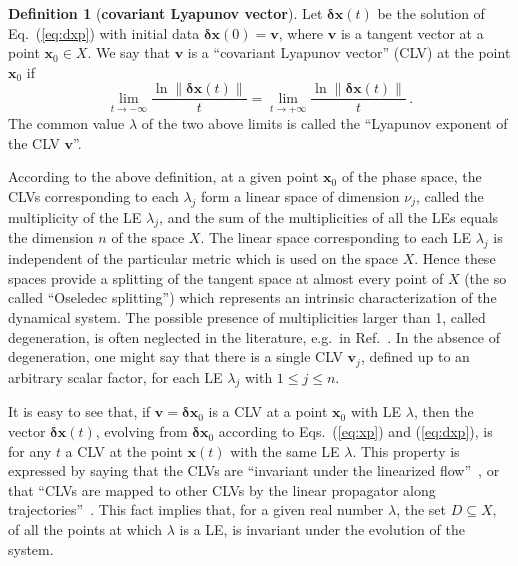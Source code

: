 \documentclass{article}
\theoremstyle{plain}
\theoremstyle{definition}
\newtheorem{definition}[theorem]{Definition}
\theoremstyle{remark}
\newcommand{\vect}[1]{\boldsymbol{#1}}
\providecommand{\detail}[1]{#1}
\renewcommand{\detail}[1]{}
\begin{document}
\begin{definition}[{\bf covariant Lyapunov vector}]\label{def:clv}
  Let $\vect{\delta x}(t)$ be the solution of Eq.~(\ref{eq:dxp}) with
  initial data $\vect{\delta x}(0)=\vect{v}$, where $\vect{v}$ is a
  tangent vector at a point $\vect{x}_0\in X$. We say that $\vect{v}$
  is a ``covariant Lyapunov vector'' (CLV) at the point $\vect{x}_0$ if
  \begin{equation}\label{eq:limits}
    \lim_{t\to -\infty} \frac{\ln \lVert \vect{\delta x}(t) \rVert}{t} =
    \lim_{t\to +\infty} \frac{\ln \lVert \vect{\delta x}(t) \rVert}{t} \, .
  \end{equation}
  The common value $\lambda$ of the two above limits is called the
  ``Lyapunov exponent of the CLV $\vect{v}$''.
\end{definition}

According to the above definition, at a given point $\vect{x}_0$ of 
the phase space,
the CLVs corresponding to each $\lambda_j$ form a linear space of
dimension $\nu_j$, called the multiplicity of the LE $\lambda_j$, and
the sum of the multiplicities of all the LEs equals the dimension $n$
of the space $X$.  The linear space corresponding to each LE
$\lambda_j$ is independent of the particular metric which is used on
the space $X$. Hence these spaces provide a splitting of the tangent
space at almost every point of $X$ (the so called ``Oseledec
splitting'') which represents an intrinsic characterization of the
dynamical system.  The possible presence of multiplicities larger than
1, called degeneration, is often neglected in the literature, e.g.\ in
Ref.~\cite{ginelli2007}. \detail{see note 10} In the absence of
degeneration, one might say that
there is a single CLV $\vect{v}_j$, defined up to an
arbitrary scalar factor, for each LE $\lambda_j$ with $1\le j\le n$.

It is easy to see that, if $\vect{v}=\vect{\delta x}_0$ is a CLV at a
point $\vect{x}_0$ with LE $\lambda$, then the vector $\vect{\delta
  x}(t)$, evolving from $\vect{\delta x}_0$ according to
Eqs.~(\ref{eq:xp}) and (\ref{eq:dxp}), is for any $t$ a CLV at the
point $\vect{x}(t)$ with the same LE $\lambda$.  This property is
expressed by saying that the CLVs are ``invariant under the linearized
flow''~\cite{wolfe2007}, or that ``CLVs are mapped to other CLVs by
the linear propagator along trajectories''~\cite{noethen_thesis}.
This fact implies that, for a given real number $\lambda$, the set
$D\subseteq X$, of all the points at which $\lambda$ is a LE, is
invariant under the evolution of the system.
\end{document}
